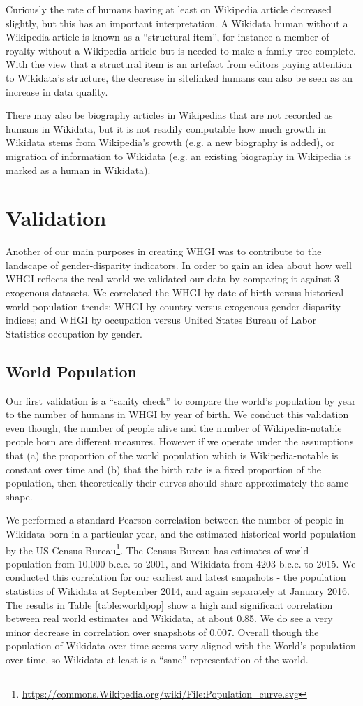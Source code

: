 \documentclass{sig-alternate-05-2015}
\begin{document}
Curiously the rate of humans having at least on Wikipedia article decreased slightly, but this has an important interpretation. A Wikidata human without a Wikipedia article is known as a ``structural item'', for instance a member of royalty without a Wikipedia article but is needed to make a family tree complete. With the view that a structural item is an artefact from editors paying attention to Wikidata's structure, the decrease in sitelinked humans can also be seen as an increase in data quality. 

There may also be biography articles in Wikipedias that are not recorded as humans in Wikidata, but it is not readily computable how much growth in Wikidata stems from Wikipedia's growth (e.g. a new biography is added), or migration of information to Wikidata (e.g. an existing biography in Wikipedia is marked as a human in Wikidata).


\section{Validation}
Another of our main purposes in creating WHGI was to contribute to the landscape of gender-disparity indicators. In order to gain an idea about how well WHGI reflects the real world we validated our data by comparing it against 3 exogenous datasets. We correlated the WHGI by date of birth versus historical world population trends; WHGI by country versus exogenous gender-disparity indices; and WHGI by occupation versus United States Bureau of Labor Statistics occupation by gender.

\subsection{World Population} Our first validation is a ``sanity check'' to compare the world's population by year to the number of humans in WHGI by year of birth. We conduct this validation even though, the number of people alive and the number of Wikipedia-notable people born are different measures. However if we operate under the assumptions that (a) the proportion of the world population which is Wikipedia-notable is constant over time and (b) that the birth rate is a fixed proportion of the population, then theoretically their curves should share approximately the same shape.

We performed a standard Pearson correlation between the number of people in Wikidata born in a particular year, and the estimated historical world population by the US Census
Bureau\footnote{\url{https://commons.Wikipedia.org/wiki/File:Population_curve.svg}}. The Census Bureau has estimates of world population from 10,000 b.c.e. to 2001, and Wikidata from 4203 b.c.e. to 2015. We conducted this correlation for our earliest and latest snapshots - the population statistics of Wikidata at September 2014, and again separately at January 2016. The results in Table \ref{table:worldpop} show a high and significant correlation between real world estimates and Wikidata, at about 0.85. We do see a very minor decrease in correlation over snapshots of 0.007. Overall though the population of Wikidata over time seems very aligned with the World's population over time, so Wikidata at least is a ``sane'' representation of the world.
\end{document}
